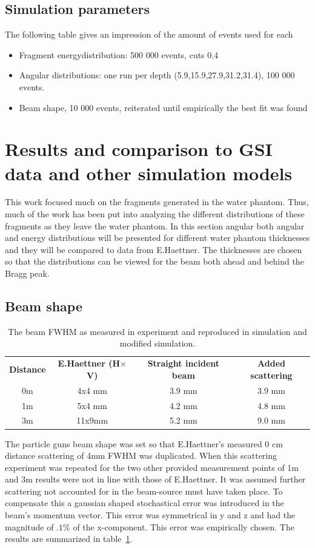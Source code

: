 \subsection{Simulation parameters}
The following table gives an impression of the amount of events used for each
\begin{itemize}
 \item Fragment energydistribution: 500 000 events, cuts 0.4
 \item Angular distributions: one run per depth (5.9,15.9,27.9,31.2,31.4), 100 000 events.
 \item Beam shape, 10 000 events, reiterated until empirically the best fit was found
\end{itemize}

\clearpage
\section{Results and comparison to GSI data and other simulation models}

This work focused much on the fragments generated in the water phantom. Thus, much of the work has been put into analyzing the different distributions of these fragments as they leave the water phantom. In this section angular both angular and energy distributions will be presented for different water phantom thicknesses and they will be compared to data from E.Haettner. The thicknesses are chosen so that the distributions can be viewed for the beam both ahead and behind the Bragg peak.

\subsection{Beam shape\label{beamShapeAnalysis}}
\begin{center}
 \begin{table}[!h]
\begin{tabular}{cccc} %
\textbf{Distance} & \textbf{E.Haettner (H$\times$V)} & \textbf{Straight incident beam} & \textbf{Added scattering} \\
0m &4x4 mm& 3.9 mm & 3.9 mm\\
1m &5x4 mm & 4.2 mm & 4.8 mm\\
3m &11x9mm& 5.2 mm & 9.0 mm\\
\end{tabular} 
\caption{\label{fig:beamFWHMtable} The beam FWHM as measured in experiment and reproduced in simulation and modified simulation.}
\end{table}
\end{center}
The particle guns beam shape was set so that E.Haettner's measured 0 cm distance scattering of 4mm FWHM was duplicated. When this scattering experiment was repeated for the two other provided measurement points of 1m and 3m results were not in line with those of E.Haettner. It was assumed further scattering not accounted for in the beam-source must have taken place. To compensate this a gaussian shaped stochastical error was introduced in the beam's momentum vector. This error was symmetrical in y and z and had the magnitude of $.1 \%$ of the x-component. This error was empirically chosen. The results are summarized in table~\ref{fig:beamFWHMtable}.


